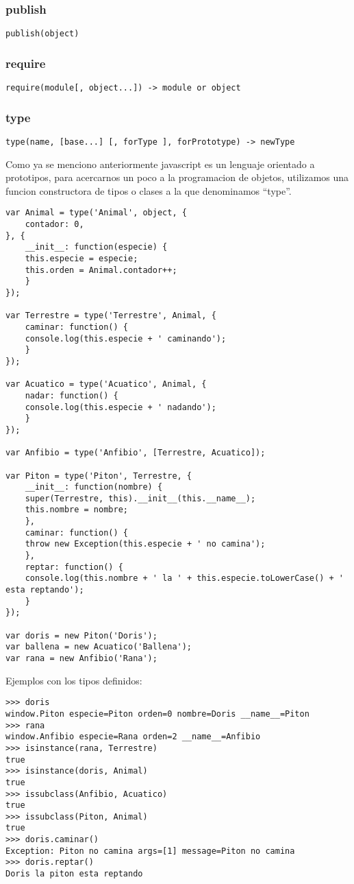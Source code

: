 \subsubsection*{publish}
\verb|publish(object)|

\subsubsection*{require}
\verb|require(module[, object...]) -> module or object|

\subsubsection*{type}
\verb|type(name, [base...] [, forType ], forPrototype) -> newType|

Como ya se menciono anteriormente javascript es un lenguaje orientado a prototipos, para acercarnos un poco a la programacion
de objetos, utilizamos una funcion constructora de tipos o clases a la que denominamos “type”.
\begin{lstlisting}[style=javascript,label=definicion-de-tipos,caption=Definicion de tipos]
var Animal = type('Animal', object, {
    contador: 0,
}, {
    __init__: function(especie) {
	this.especie = especie;
	this.orden = Animal.contador++;
    }
});

var Terrestre = type('Terrestre', Animal, {
    caminar: function() {
	console.log(this.especie + ' caminando');
    }
});

var Acuatico = type('Acuatico', Animal, {
    nadar: function() {
	console.log(this.especie + ' nadando');
    }
});

var Anfibio = type('Anfibio', [Terrestre, Acuatico]);

var Piton = type('Piton', Terrestre, {
    __init__: function(nombre) {
	super(Terrestre, this).__init__(this.__name__);
	this.nombre = nombre;
    },
    caminar: function() {
	throw new Exception(this.especie + ' no camina');
    },
    reptar: function() {
	console.log(this.nombre + ' la ' + this.especie.toLowerCase() + ' esta reptando');
    }
});

var doris = new Piton('Doris');
var ballena = new Acuatico('Ballena');
var rana = new Anfibio('Rana');
\end{lstlisting}

\noindent
Ejemplos con los tipos definidos:
\begin{lstlisting}[style=consola]
>>> doris
window.Piton especie=Piton orden=0 nombre=Doris __name__=Piton
>>> rana
window.Anfibio especie=Rana orden=2 __name__=Anfibio
>>> isinstance(rana, Terrestre)
true
>>> isinstance(doris, Animal)
true
>>> issubclass(Anfibio, Acuatico)
true
>>> issubclass(Piton, Animal)
true
>>> doris.caminar()
Exception: Piton no camina args=[1] message=Piton no camina
>>> doris.reptar()
Doris la piton esta reptando
\end{lstlisting}

